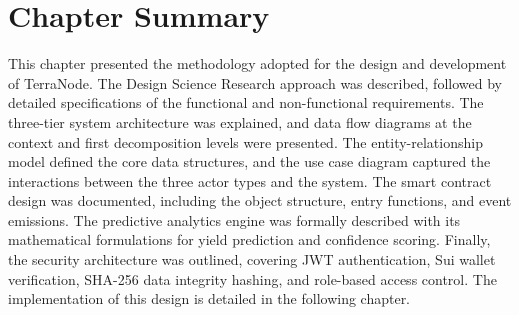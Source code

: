 \section{Chapter Summary}

This chapter presented the methodology adopted for the design and development of TerraNode. The Design Science Research approach was described, followed by detailed specifications of the functional and non-functional requirements. The three-tier system architecture was explained, and data flow diagrams at the context and first decomposition levels were presented. The entity-relationship model defined the core data structures, and the use case diagram captured the interactions between the three actor types and the system. The smart contract design was documented, including the object structure, entry functions, and event emissions. The predictive analytics engine was formally described with its mathematical formulations for yield prediction and confidence scoring. Finally, the security architecture was outlined, covering JWT authentication, Sui wallet verification, SHA-256 data integrity hashing, and role-based access control. The implementation of this design is detailed in the following chapter.
